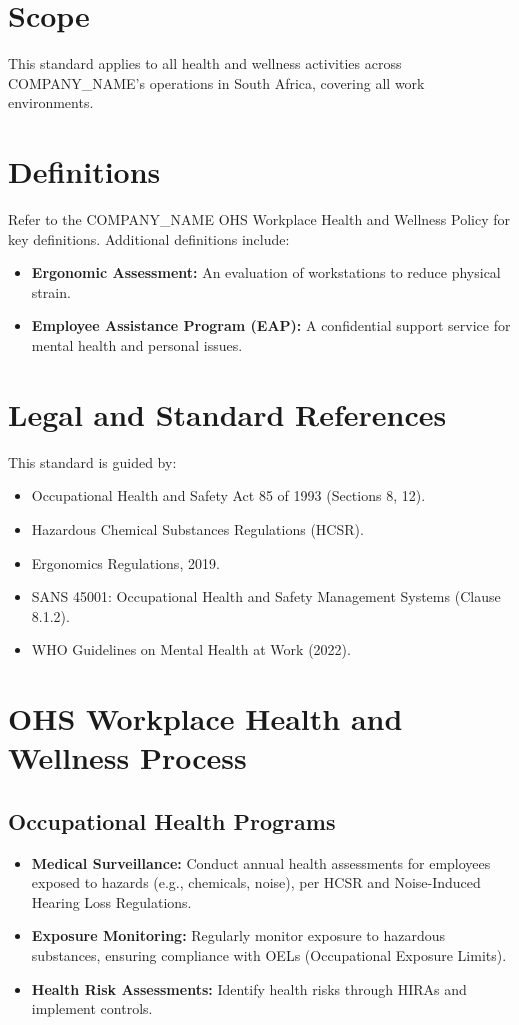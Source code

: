 \documentclass[12pt]{article}
\begin{document}
\section{Scope}
This standard applies to all health and wellness activities across {{COMPANY_NAME}}’s operations in South Africa, covering all work environments.

\section{Definitions}
Refer to the {{COMPANY_NAME}} OHS Workplace Health and Wellness Policy for key definitions. Additional definitions include:
\begin{itemize}
    \item \textbf{Ergonomic Assessment:} An evaluation of workstations to reduce physical strain.
    \item \textbf{Employee Assistance Program (EAP):} A confidential support service for mental health and personal issues.
\end{itemize}

\section{Legal and Standard References}
This standard is guided by:
\begin{itemize}
    \item Occupational Health and Safety Act 85 of 1993 (Sections 8, 12).
    \item Hazardous Chemical Substances Regulations (HCSR).
    \item Ergonomics Regulations, 2019.
    \item SANS 45001: Occupational Health and Safety Management Systems (Clause 8.1.2).
    \item WHO Guidelines on Mental Health at Work (2022).
\end{itemize}

\section{OHS Workplace Health and Wellness Process}

\subsection{Occupational Health Programs}
\begin{itemize}
    \item \textbf{Medical Surveillance:} Conduct annual health assessments for employees exposed to hazards (e.g., chemicals, noise), per HCSR and Noise-Induced Hearing Loss Regulations.
    \item \textbf{Exposure Monitoring:} Regularly monitor exposure to hazardous substances, ensuring compliance with OELs (Occupational Exposure Limits).
    \item \textbf{Health Risk Assessments:} Identify health risks through HIRAs and implement controls.
\end{itemize}
\end{document}
